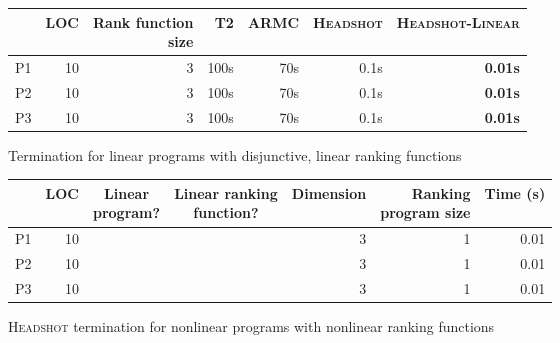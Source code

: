 \documentclass[preprint]{sigplanconf}
\theoremstyle{definition}
\newcommand{\xmark}{\ding{55}}
\begin{document}
\begin{figure*}
\centering
\begin{tabular}{|l|r|r||r|r|r|r|}
\hline
    & LOC & \shortstack{Rank function \\ size} & \textsc{T2} & \textsc{ARMC} & \textsc{Headshot} & \textsc{Headshot-Linear} \\
    \hline
    \hline
 P1 & 10 & 3 & 100s & 70s & 0.1s & \bf{0.01s} \\
 P2 & 10 & 3 & 100s & 70s & 0.1s & \bf{0.01s} \\
 P3 & 10 & 3 & 100s & 70s & 0.1s & \bf{0.01s} \\
 \hline
\end{tabular}
\caption{Termination for linear programs with disjunctive, linear ranking functions\label{fig:linear}}
\end{figure*}

\begin{figure*}
\centering
\begin{tabular}{|l|r|c|c|r|r|r|}
\hline
    & LOC & \shortstack{Linear \\ program?} & \shortstack{Linear ranking \\ function?}  & Dimension & \shortstack{Ranking \\ program size} & Time (s)\\
    \hline
    \hline
 P1 & 10 & \xmark & \xmark & 3 & 1 & 0.01 \\
 P2 & 10 & \xmark & \xmark & 3 & 1 & 0.01 \\
 P3 & 10 & \xmark & \xmark & 3 & 1 & 0.01 \\
 \hline
\end{tabular}

\caption{\textsc{Headshot} termination for nonlinear programs with nonlinear ranking functions\label{fig:nonlinear}}
 \end{figure*}



{}
\end{document}
